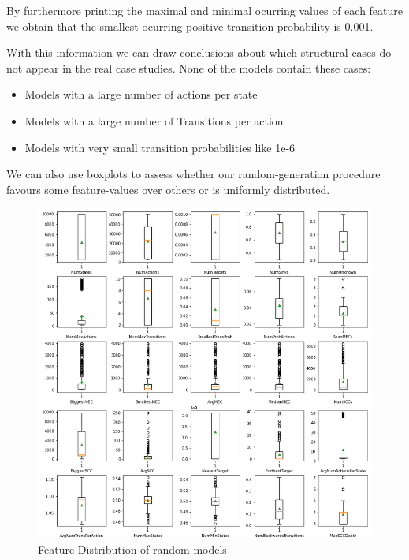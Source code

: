 By furthermore printing the maximal and minimal ocurring values of each feature we obtain that the smallest ocurring positive transition probability is 0.001.

With this information we can draw conclusions about which structural cases do not appear in the real case studies. 
None of the models contain these cases:
\begin{itemize}
    \item Models with a large number of actions per state
    \item Models with a large number of Transitions per action
    \item Models with very small transition probabilities like 1e-6
\end{itemize}

We can also use boxplots to assess whether our random-generation procedure favours some feature-values over others or is uniformly distributed.
\begin{figure}[t]
    \centering
    \includegraphics[width=1\textwidth]{figures/RandomRandom_FeatureDistribution.png}
    \caption[Feature Distribution of random models]{
        Feature Distribution of random models
    }
    \label{fig:Random_FeatureDistribution}
\end{figure}

